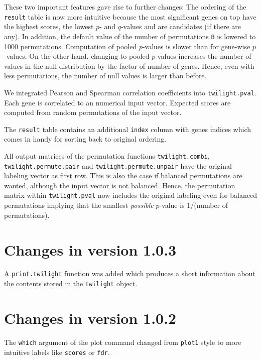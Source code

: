 \documentclass[11pt,a4paper,fleqn]{report}
\newcommand{\Robject}[1]{{\texttt{#1}}}
\newcommand{\Rfunction}[1]{{\texttt{#1}}}
\newcommand{\Rfunarg}[1]{{\texttt{#1}}}
\begin{document}
These two important features gave rise to further changes: The ordering of the \Robject{result} table is now more intuitive because the most significant genes on top have the highest scores, the lowest $p$- and $q$-values and are candidates (if there are any). In addition, the default value of the number of permutations \Rfunarg{B} is lowered to 1000 permutations. Computation of pooled $p$-values is slower than for gene-wise $p$-values. On the other hand, changing to pooled $p$-values increases the number of values in the null distribution by the factor of number of genes. Hence, even with less permutations, the number of null values is larger than before.

We integrated Pearson and Spearman correlation coefficients into \Rfunction{twilight.pval}. Each gene is correlated to an numerical input vector. Expected scores are computed from random permutations of the input vector.
       
The \Robject{result} table contains an additional \Robject{index} column with genes indices which comes in handy for sorting back to original ordering.

All output matrices of the permutation functions \Rfunction{twilight.combi}, \Rfunction{twilight.permute.pair} and \Rfunction{twilight.permute.unpair} have the original labeling vector as first row. This is also the case if balanced permutations are wanted, although the input vector is not balanced. Hence, the permutation matrix within \Rfunction{twilight.pval} now includes the original labeling even for balanced permutations implying that the smallest \textit{possible} $p$-value is 1/(number of permutations).


\section*{Changes in version 1.0.3}

A \Rfunction{print.twilight} function was added which produces a short information about the contents stored in the \Robject{twilight} object.


\section*{Changes in version 1.0.2}

The \Rfunarg{which} argument of the plot command changed from \Rfunction{plot1} style to more intuitive labels like \Rfunarg{scores} or \Rfunarg{fdr}.

       
\end{document}
